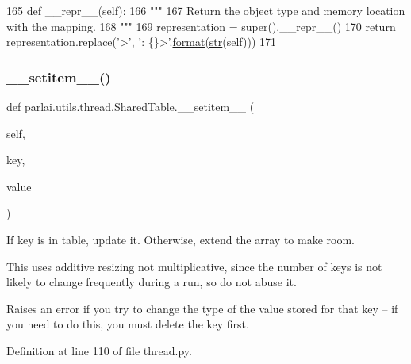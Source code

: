 \begin{DoxyCode}
165     \textcolor{keyword}{def }\_\_repr\_\_(self):
166         \textcolor{stringliteral}{"""}
167 \textcolor{stringliteral}{        Return the object type and memory location with the mapping.}
168 \textcolor{stringliteral}{        """}
169         representation = super().\_\_repr\_\_()
170         \textcolor{keywordflow}{return} representation.replace(\textcolor{stringliteral}{'>'}, \textcolor{stringliteral}{': \{\}>'}.\hyperlink{namespaceparlai_1_1chat__service_1_1services_1_1messenger_1_1shared__utils_a32e2e2022b824fbaf80c747160b52a76}{format}(\hyperlink{namespacegenerate__task__READMEs_a5b88452ffb87b78c8c85ececebafc09f}{str}(self)))
171 
\end{DoxyCode}
\mbox{\label{classparlai_1_1utils_1_1thread_1_1SharedTable_a43bc2c55c2125ce9c4848933fadeef5c}} 
\subsubsection{\texorpdfstring{\+\_\+\+\_\+setitem\+\_\+\+\_\+()}{\_\_setitem\_\_()}}
{\footnotesize\ttfamily def parlai.\+utils.\+thread.\+Shared\+Table.\+\_\+\+\_\+setitem\+\_\+\+\_\+ (\begin{DoxyParamCaption}\item[{}]{self,  }\item[{}]{key,  }\item[{}]{value }\end{DoxyParamCaption})}

\begin{DoxyVerb}If key is in table, update it. Otherwise, extend the array to make room.

This uses additive resizing not multiplicative, since the number
of keys is not likely to change frequently during a run, so do not
abuse it.

Raises an error if you try to change the type of the value stored for
that key -- if you need to do this, you must delete the key first.
\end{DoxyVerb}
 

Definition at line 110 of file thread.\+py.


